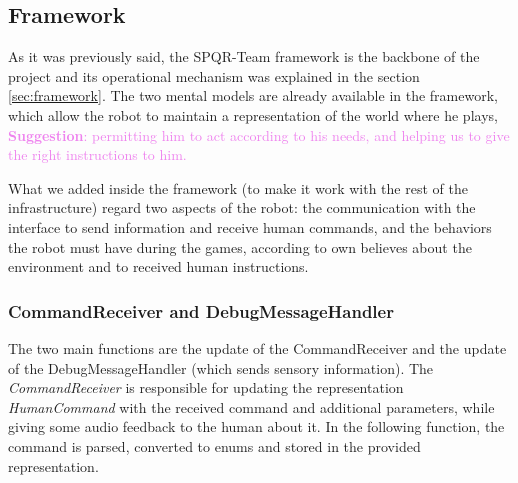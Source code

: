 \documentclass[a4paper, onecolumn, 12pt]{article}
\newcommand\suggestion[1]{\textcolor{violet}{\textbf{Suggestion}: #1}}
\begin{document}
\subsection{Framework}
As it was previously said, the SPQR-Team framework is the backbone of the project and its
operational mechanism was explained in the section \ref{sec:framework}.
The two mental models are already available in the framework, which allow the robot to
maintain a representation of the world where he plays, \suggestion{permitting him to act according to
his needs, and helping us to give the right instructions to him.} 

What we added inside the framework (to make it work with the rest of the infrastructure) 
regard two aspects of the robot: the communication with the interface to send information
and receive human commands, and the behaviors the robot must have during the games, according
to own believes about the environment and to received human instructions.

\subsubsection{CommandReceiver and DebugMessageHandler}
The two main functions are the update of the CommandReceiver and the update of the DebugMessageHandler 
(which sends sensory information). The \textit{CommandReceiver} is responsible for updating the
representation \textit{HumanCommand} with the received command and additional parameters, 
while giving some audio feedback to the human about it. 
In the following function, the command is parsed,
converted to enums and stored in the provided representation. 
\end{document}
